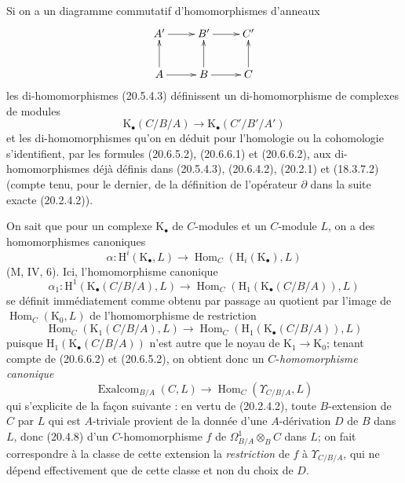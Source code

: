 Si on a un diagramme commutatif d'homomorphismes d'anneaux
\[
\xymatrix{
  A' \ar[r] & B' \ar[r] & C' \\
  A \ar[u] \ar[r] & B \ar[u] \ar[r] & C \ar[u]
}
\]
les di-homomorphismes (20.5.4.3) définissent un di-homomorphisme de
complexes de modules
\begin{equation}
\tag{20.6.6.4}
\label{0.20.6.6.4-fr}
  \mathrm{K}_\bullet(C/B/A)\longrightarrow
  \mathrm{K}_\bullet(C'/B'/A')
\end{equation}
et les di-homomorphismes qu'on en déduit pour l'homologie ou la
cohomologie s'identifient, par les formules (20.6.5.2), (20.6.6.1) et
(20.6.6.2), aux di-homomorphismes déjà définis dans (20.5.4.3),
(20.6.4.2), (20.2.1) et (18.3.7.2) (compte tenu, pour le dernier, de la
définition de l'opérateur $\partial$ dans la suite exacte (20.2.4.2)).

\begin{env}[20.6.7]
\label{0.20.6.7-fr}
On sait que pour un complexe $\mathrm{K}_\bullet$ de $C$-modules et un
$C$-module $L$, on a des homomorphismes canoniques
\[
  \alpha:\mathrm{H}^i(\mathrm{K}_\bullet,L)\longrightarrow
  \operatorname{Hom}_C(\mathrm{H}_i(\mathrm{K}_\bullet),L)
\]
(M, IV, 6). Ici, l'homomorphisme canonique
\[
  \alpha_1:\mathrm{H}^1(\mathrm{K}_\bullet(C/B/A),L)
  \longrightarrow
  \operatorname{Hom}_C(\mathrm{H}_1(\mathrm{K}_\bullet(C/B/A)),L)
\]
se définit immédiatement comme obtenu par passage au quotient par l'image
de $\operatorname{Hom}_C(\mathrm{K}_0,L)$ de l'homomorphisme de restriction
\[
  \operatorname{Hom}_C(\mathrm{K}_1(C/B/A),L)\longrightarrow
  \operatorname{Hom}_C(\mathrm{H}_1(\mathrm{K}_\bullet(C/B/A)),L)
\]
puisque $\mathrm{H}_1(\mathrm{K}_\bullet(C/B/A))$ n'est autre que le
noyau de $\mathrm{K}_1\to\mathrm{K}_0$; tenant compte de (20.6.6.2) et
(20.6.5.2), on obtient donc un $C$-\emph{homomorphisme canonique}
\begin{equation}
\tag{20.6.7.1}
\label{0.20.6.7.1-fr}
  \operatorname{Exalcom}_{B/A}(C,L)\longrightarrow
  \operatorname{Hom}_C(\Upsilon_{C/B/A},L)
\end{equation}
qui s'explicite de la façon suivante : en vertu de (20.2.4.2), toute
$B$-extension de $C$ par $L$ qui est $A$-triviale provient de la donnée
d'une $A$-dérivation $D$ de $B$ dans $L$, donc (20.4.8) d'un
$C$-homomorphisme $f$ de $\Omega^1_{B/A}\otimes_B C$ dans $L$; on fait
correspondre à la classe de cette extension la \emph{restriction} de $f$
à $\Upsilon_{C/B/A}$, qui ne dépend effectivement que de cette classe et
non du choix de $D$.
\end{env}

